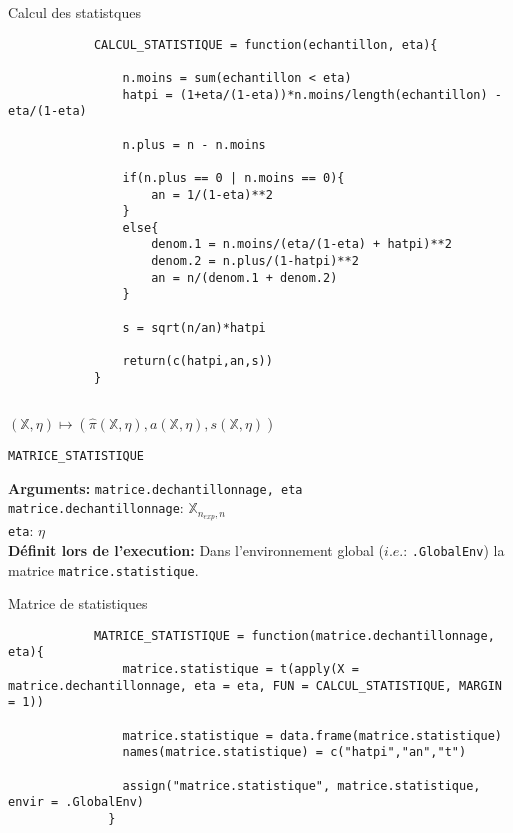 \documentclass{article}
\newenvironment{fonction}[1][htb]
  {\renewcommand{\algorithmcfname}{Fonction}%
   \begin{algorithm}[#1]%
  }{\end{algorithm}}
\begin{document}
    \begin{script}
        \caption{Calcul des statistques}
        \begin{verbatim}
            CALCUL_STATISTIQUE = function(echantillon, eta){
  
                n.moins = sum(echantillon < eta)
                hatpi = (1+eta/(1-eta))*n.moins/length(echantillon) - eta/(1-eta)
                
                n.plus = n - n.moins
                
                if(n.plus == 0 | n.moins == 0){
                    an = 1/(1-eta)**2
                }
                else{
                    denom.1 = n.moins/(eta/(1-eta) + hatpi)**2
                    denom.2 = n.plus/(1-hatpi)**2
                    an = n/(denom.1 + denom.2)
                }
                
                s = sqrt(n/an)*hatpi
                
                return(c(hatpi,an,s))
            }
            
        \end{verbatim}
    \end{script}

    \begin{center}
        $ (\mathbb{X},\eta) \longmapsto (\hat\pi(\mathbb{X},\eta),a(\mathbb{X},\eta),s(\mathbb{X},\eta)) $
    \end{center}

\clearpage
\pagebreak
\newpage

    \begin{fonction}[t]
       \caption{\texttt{MATRICE\_STATISTIQUE}}
       \textbf{Arguments:} \texttt{matrice.dechantillonnage, eta} \\
        \texttt{matrice.dechantillonnage}: $\mathbb{X}_{n_{exp},n}$ \\
        \texttt{eta}: $\eta$ \\
        \textbf{Définit lors de l'execution:} Dans l'environnement global ($i.e.$: \texttt{.GlobalEnv}) la matrice \texttt{matrice.statistique}.
    \end{fonction}

    \begin{script}[t]
        \caption{Matrice de statistiques}
        \begin{verbatim}
            MATRICE_STATISTIQUE = function(matrice.dechantillonnage, eta){
                matrice.statistique = t(apply(X = matrice.dechantillonnage, eta = eta, FUN = CALCUL_STATISTIQUE, MARGIN = 1))
                
                matrice.statistique = data.frame(matrice.statistique)
                names(matrice.statistique) = c("hatpi","an","t")
                
                assign("matrice.statistique", matrice.statistique, envir = .GlobalEnv) 
              }
        \end{verbatim}
    \end{script}
\end{document}
